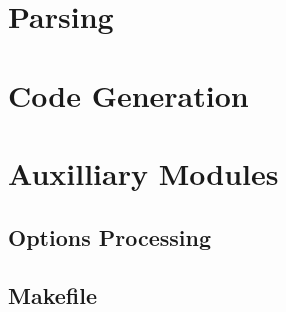 \documentclass[11pt, oneside]{book}              %
\begin{document}




\part{Parsing}





\part{Code Generation}

\part{Auxilliary Modules}

\chapter{Options Processing}

\chapter{Makefile}
\end{document}
